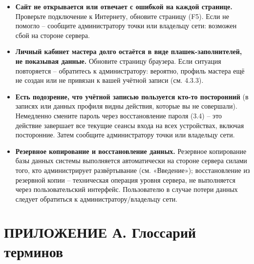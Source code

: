 \begin{itemize}
  \item \textbf{Сайт не открывается или отвечает с ошибкой на каждой
        странице.} Проверьте подключение к Интернету, обновите страницу
        (F5). Если не помогло -- сообщите администратору точки или
        владельцу сети: возможен сбой на стороне сервера.
  \item \textbf{Личный кабинет мастера долго остаётся в виде
        плашек-заполнителей, не показывая данные.} Обновите страницу
        браузера. Если ситуация повторяется -- обратитесь к администратору:
        вероятно, профиль мастера ещё не создан или не привязан к вашей
        учётной записи (см. 4.3.3).
  \item \textbf{Есть подозрение, что учётной записью пользуется кто-то
        посторонний} (в записях или данных профиля видны действия, которые
        вы не совершали). Немедленно смените пароль через восстановление
        пароля (3.4) -- это действие завершает все текущие сеансы входа
        на всех устройствах, включая посторонние. Затем сообщите
        администратору точки или владельцу сети.
  \item \textbf{Резервное копирование и восстановление данных.} Резервное
        копирование базы данных системы выполняется автоматически на
        стороне сервера силами того, кто администрирует развёртывание
        (см. «Введение»); восстановление из резервной копии -- техническая
        операция уровня сервера, не выполняется через пользовательский
        интерфейс. Пользователю в случае потери данных следует обратиться
        к администратору/владельцу сети.
\end{itemize}

\clearpage
\appendix
\renewcommand{\thefigure}{\Alph{section}.\arabic{figure}}

\section*{ПРИЛОЖЕНИЕ А. Глоссарий терминов}

